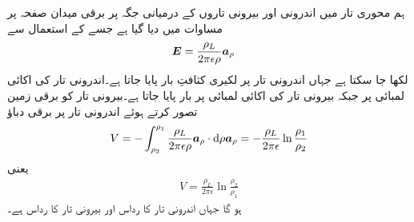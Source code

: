 ہم محوری تار میں اندرونی اور بیرونی تاروں کے درمیانی جگہ پر برقی میدان صفحہ  پر  مساوات  میں دیا گیا ہے جسے  کے استعمال سے
\begin{align}\label{مساوات_توانائی_ہم_محوری_تار_ذوبرق_میدان}
{\ensuremath{{\boldsymbol{E}}}}&=\frac{\rho_L}{2\pi \epsilon \rho} {\boldsymbol{a}}_{\rho}
\end{align}
لکھا جا سکتا ہے جہاں اندرونی تار پر  لکیری کثافتِ بار پایا جاتا ہے۔اندرونی تار  کی اکائی لمبائی پر  جبکہ بیرونی تار کی اکائی لمبائی پر  بار پایا جاتا ہے۔بیرونی تار کو برقی زمین تصور کرتے ہوئے اندرونی تار پر برقی دباؤ
\begin{align*}
V=-\int_{\rho_2}^{\rho_1} \frac{\rho_L}{2\pi \epsilon \rho} \arho \cdot  \dif \rho \arho=-\frac{\rho_L}{2\pi\epsilon} \ln \frac{\rho_1}{\rho_2}
\end{align*}
یعنی
\begin{align}\label{مساوات_توانائی_ہم_محوری_تار_برقی_دباو}
V=\frac{\rho_L}{2\pi\epsilon} \ln \frac{\rho_2}{\rho_1}
\end{align}
ہو گا جہاں اندرونی تار کا رداس  اور بیرونی تار کا رداس  ہے۔

